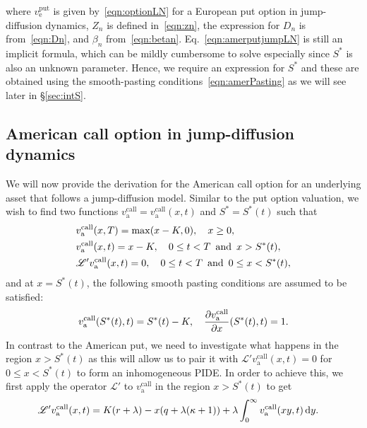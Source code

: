 		where $v_{\text{e}}^{\text{put}}$ is given by~\eqref{eqn:optionLN} for a European put option in jump-diffusion dynamics, $Z_n$ is defined in~\eqref{eqn:zn}, the expression for $D_n$ is from~\eqref{eqn:Dn}, and $\beta_n$ from~\eqref{eqn:betan}. Eq.~\eqref{eqn:amerputjumpLN} is still an implicit formula, which can be mildly cumbersome to solve especially since $S^*$ is also an unknown parameter. Hence, we require an expression for $S^*$ and these are obtained using the smooth-pasting conditions~\eqref{eqn:amerPasting} as we will see later in \S \ref{sec:intS}.
		
		\subsection{American call option in jump-diffusion dynamics}
		We will now provide the derivation for the American call option for an underlying asset that follows a jump-diffusion model. Similar to the put option valuation, we wish to find two functions $v_{\text{a}}^{\text{call}} = v_{\text{a}}^{\text{call}}(x,t)$ and $S^* = S^*(t)$ such that
		\begin{equation}
        \label{eqn:amercallPIDE}
        \begin{split}
            &v_{\text{a}}^{\text{call}}(x,T) = \max(x-K,0), \quad x \geq 0, \\
            &v_{\text{a}}^{\text{call}}(x,t) = x-K, \quad 0 \leq t < T \enskip \text{and} \enskip x > S^*(t), \\
            &\mathscr{L'}v_{\text{a}}^{\text{call}}(x,t) = 0, \quad 0 \leq t < T \enskip \text{and} \enskip 0 \leq x < S^*(t),
        \end{split}
    \end{equation}
    and at $x = S^*(t)$, the following smooth pasting conditions are assumed to be satisfied:
    	\begin{equation}
    		\label{eqn:amercallPIDEsmc}
    		v_{\text{a}}^{\text{call}}(S^*(t),t) = S^*(t) - K, \quad \frac{\partial v_{\text{a}}^{\text{call}}}{\partial x}(S^*(t),t) = 1.
    	\end{equation}
	In contrast to the American put, we need to investigate what happens in the region $x > S^*(t)$ as this will allow us to pair it with $\mathscr{L'}v_{\text{a}}^{\text{call}}(x,t) = 0$ for $0 \leq x < S^*(t)$ to form an inhomogeneous PIDE. In order to achieve this, we first apply the operator $\mathscr{L'}$ to $v_{\text{a}}^{\text{call}}$ in the region $x > S^*(t)$ to get
		 \begin{align*}
            \mathscr L'v_{\text{a}}^{\text{call}}(x,t) &=  K(r+\lambda) - x(q + \lambda(\kappa+1)) + \lambda\int_0^\infty v_{\text{a}}^{\text{call}}(xy,t) \, \mathrm d y.
        \end{align*}
